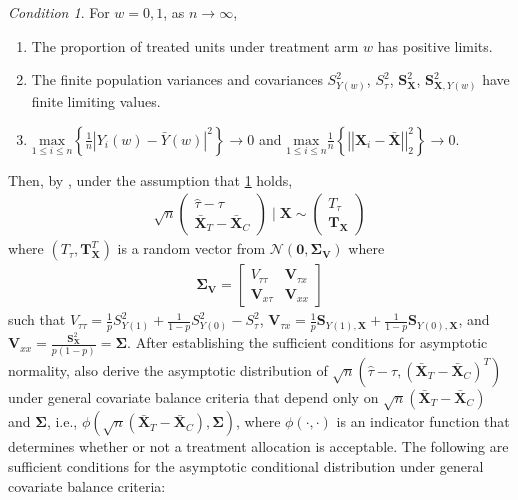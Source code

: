 \documentclass[11pt,twoside]{article}
\theoremstyle{definition}
\theoremstyle{remark}
\newtheorem{condition}{Condition}
\begin{document}
\begin{condition} \label{asymptotic_norm_condition}
For $w = 0, 1$, as $n \to \infty$,
    \begin{enumerate}
    \item[(i)] The proportion of treated units under treatment arm $w$ has positive limits.
    \item[(ii)] The finite population variances and covariances $S^2_{Y(w)}$, $S^2_\tau$, $\mathbf{S}^2_{\mathbf{X}}$, $\mathbf{S}^2_{\mathbf{X}, Y(w)}$ have finite limiting values.
    \item[(iii)] $\underset{1 \leq i \leq n}{\text{max}} \left\{ \frac{1}{n} \left| Y_i(w) - \bar{Y}(w)\right|^2 \right\} \to 0$ and $\underset{1 \leq i \leq n}{\text{max}} \frac{1}{n} \left\{ \left| \left| \mathbf{X}_i - \bar{\mathbf{X}} \right|\right|^2_2 \right\} \to 0$.
\end{enumerate}
\end{condition}
Then, by \cite{li2018asymptotic}, under the assumption that \cref{asymptotic_norm_condition} holds,  
\begin{align*}
     \sqrt{n}\begin{pmatrix}
        \widehat{\tau} - \tau \\
        \bar{\mathbf{X}}_T - \bar{\mathbf{X}}_C
    \end{pmatrix} \mid \mathbf{X} \sim \begin{pmatrix}
        T_\tau \\
        \mathbf{T}_{\mathbf{X}}
    \end{pmatrix}
\end{align*}
where $(T_\tau, \mathbf{T}^T_{\mathbf{X}})$ is a random vector from $\mathcal{N}(\mathbf{0}, \mathbf{\Sigma}_{\mathbf{V}})$ where
\begin{align*}
    \mathbf{\Sigma}_{\mathbf{V}} = \begin{bmatrix}
        V_{\tau \tau} & \mathbf{V}_{\tau x} \\
        \mathbf{V}_{x \tau} & \mathbf{V}_{xx}
    \end{bmatrix}
\end{align*}
such that $V_{\tau \tau} = \frac{1}{p} S^2_{Y(1)} + \frac{1}{1-p} S^2_{Y(0)} - S^2_\tau$, $\mathbf{V}_{\tau x} = \frac{1}{p} \mathbf{S}_{Y(1), \mathbf{X}} + \frac{1}{1-p} \mathbf{S}_{Y(0), \mathbf{X}}$, and $\mathbf{V}_{xx} = \frac{\mathbf{S}^2_{\mathbf{X}}}{p(1-p)}  = \mathbf{\Sigma}$. After establishing the sufficient conditions for asymptotic normality, \cite{li2018asymptotic} also derive the asymptotic distribution of $ \sqrt{n}( \widehat{\tau} - \tau, (\bar{\mathbf{X}}_T - \bar{\mathbf{X}}_C)^T)$ under general covariate balance criteria that depend only on $\sqrt{n}(\bar{\mathbf{X}}_T - \bar{\mathbf{X}}_C)$ and $\mathbf{\Sigma}$, i.e., $\phi(\sqrt{n}(\bar{\mathbf{X}}_T - \bar{\mathbf{X}}_C), \mathbf{\Sigma})$, where $\phi(\cdot, \cdot)$ is an indicator function that determines whether or not a treatment allocation is acceptable. The following are sufficient conditions for the asymptotic conditional distribution under general covariate balance criteria:
\end{document}
